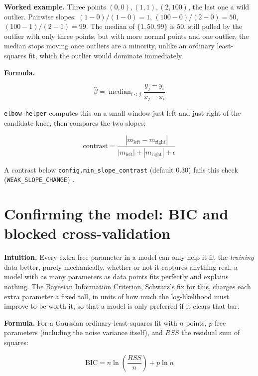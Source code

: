 \documentclass[11pt]{article}
\newcommand{\code}[1]{\texttt{#1}}
\begin{document}
\textbf{Worked example.} Three points $(0,0), (1,1), (2,100)$, the last one
a wild outlier. Pairwise slopes: $(1-0)/(1-0)=1$, $(100-0)/(2-0)=50$,
$(100-1)/(2-1)=99$. The median of $\{1, 50, 99\}$ is $50$, still pulled by
the outlier with only three points, but with more normal points and one
outlier, the median stops moving once outliers are a minority, unlike an
ordinary least-squares fit, which the outlier would dominate immediately.

\textbf{Formula.}

\begin{equation}
\hat\beta = \operatorname{median}_{i < j} \frac{y_j - y_i}{x_j - x_i}
\end{equation}

\code{elbow-helper} computes this on a small window just left and just
right of the candidate knee, then compares the two slopes:

\begin{equation}
\text{contrast} = \frac{|m_{\text{left}} - m_{\text{right}}|}{|m_{\text{left}}| + |m_{\text{right}}| + \epsilon}
\end{equation}

A contrast below \code{config.min\_slope\_contrast} (default $0.30$) fails
this check (\code{WEAK\_SLOPE\_CHANGE}) \citep{theil1950} \citep{sen1968}.

\section{Confirming the model: BIC and blocked cross-validation}
\label{sec:bic-cv}

\textbf{Intuition.} Every extra free parameter in a model can only help it
fit the \emph{training} data better, purely mechanically, whether or not it
captures anything real, a model with as many parameters as data points fits
perfectly and explains nothing. The Bayesian Information Criterion,
Schwarz's fix for this, charges each extra parameter a fixed toll, in units
of how much the log-likelihood must improve to be worth it, so that a model
is only preferred if it clears that bar.

\textbf{Formula.} For a Gaussian ordinary-least-squares fit with $n$
points, $p$ free parameters (including the noise variance itself), and
$RSS$ the residual sum of squares:

\begin{equation}
\mathrm{BIC} = n \ln\!\left(\frac{RSS}{n}\right) + p \ln n
\end{equation}
\end{document}
